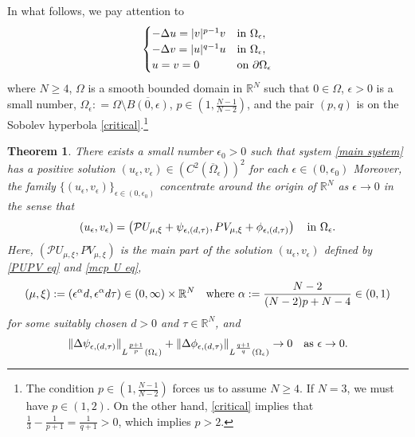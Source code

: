\documentclass[reqno]{amsart}
\newtheorem{theorem}{Theorem}[section]
\theoremstyle{remark}
\newcommand{\pa}{\partial}
\newcommand{\ep}{\epsilon}
\newcommand{\R}{\mathbb{R}}
\newcommand{\mcp}{\mathcal{P}}
\newcommand{\ovom}{\overline{\Omega}}
\newcommand{\mx}{{\mu,\xi}}
\renewcommand{\(}{\left(}
\renewcommand{\)}{\right)}
\numberwithin{equation}{section}
\begin{document}
In what follows, we pay attention to
\begin{equation}\label{main system}
\begin{cases}
-\Delta u=|v|^{p-1}v &\textup{in } \Omega_\ep,\\
-\Delta v=|u|^{q-1}u &\textup{in } \Omega_\ep,\\
u=v=0 &\textup{on } \pa \Omega_\ep
\end{cases}
\end{equation}
where $N \ge 4$, $\Omega$ is a smooth bounded domain in $\R^N$ such that $0 \in \Omega$, $\ep>0$ is a small number, $\Omega_\ep : =\Omega\setminus \overline{B(0,\ep)}$, $p \in (1,\frac{N-1}{N-2})$,
and the pair $(p,q)$ is on the Sobolev hyperbola \eqref{critical}.\footnote{The condition $p \in (1,\frac{N-1}{N-2})$ forces us to assume $N \ge 4$. If $N = 3$, we must have $p \in (1,2)$.
On the other hand, \eqref{critical} implies that $\frac{1}{3} - \frac{1}{p+1} = \frac{1}{q+1} > 0$, which implies $p > 2$.}
\begin{theorem}\label{thm main}
There exists a small number $\ep_0 > 0$ such that system \eqref{main system} has a positive solution $(u_\ep,v_\ep) \in (C^2(\ovom_\ep))^2$ for each $\ep \in (0,\ep_0)$
Moreover, the family $\{(u_\ep,v_\ep)\}_{\ep \in (0,\ep_0)}$ concentrate around the origin of $\R^N$ as $\ep \to 0$ in the sense that
\begin{equation}\label{eq main}
(u_\ep,v_\ep) = \(\mcp U_\mx+\psi_{\ep,(d,\tau)}, PV_\mx+\phi_{\ep,(d,\tau)}\) \quad \textup{in } \Omega_\ep.
\end{equation}
Here, $(\mcp U_\mx,PV_\mx)$ is the main part of the solution $(u_\ep,v_\ep)$ defined by \eqref{PUPV eq} and \eqref{mcp U eq},
\begin{equation}\label{eq main1}
(\mu,\xi) := (\ep^\alpha d, \ep^\alpha d\tau) \in (0,\infty) \times \R^N \quad \textup{where } \alpha := \frac{N-2}{(N-2)p+N-4} \in (0,1)
\end{equation}
for some suitably chosen $d > 0$ and $\tau \in \R^N$, and
\[\|\Delta \psi_{\ep,(d,\tau)}\|_{L^{\frac{p+1}{p}}(\Omega_\ep)} + \|\Delta \phi_{\ep,(d,\tau)}\|_{L^{\frac{q+1}{q}}(\Omega_\ep)} \to 0 \quad \textup{as } \ep \to 0.\]
\end{theorem}
\end{document}
